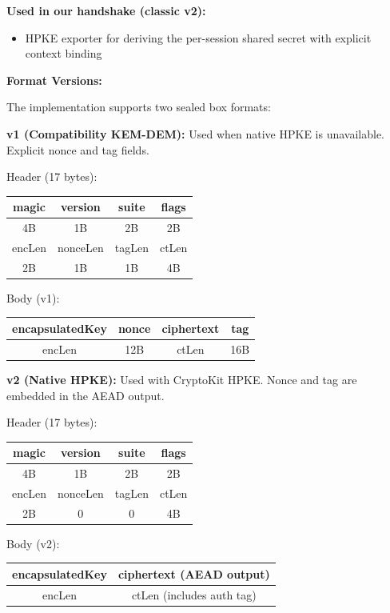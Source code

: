\documentclass[10pt,journal,compsoc]{IEEEtran}
\providecommand{\tightlist}{%
	  \setlength{\itemsep}{0pt}\setlength{\parskip}{0pt}}
\begin{document}
\textbf{Used in our handshake (classic v2):}
\begin{itemize}\tightlist
\item
  HPKE exporter for deriving the per-session shared secret with
  explicit context binding
\end{itemize}

\textbf{Format Versions:}

The implementation supports two sealed box formats:

\textbf{v1 (Compatibility KEM-DEM):} Used when native HPKE is
unavailable. Explicit nonce and tag fields.

Header (17 bytes):
\begin{center}
\small
\begin{tabular}{|c|c|c|c|}
\hline
magic & version & suite & flags \\
\hline
4B & 1B & 2B & 2B \\
\hline
encLen & nonceLen & tagLen & ctLen \\
\hline
2B & 1B & 1B & 4B \\
\hline
\end{tabular}
\end{center}

Body (v1):
\begin{center}
\small
\begin{tabular}{|c|c|c|c|}
\hline
encapsulatedKey & nonce & ciphertext & tag \\
\hline
encLen & 12B & ctLen & 16B \\
\hline
\end{tabular}
\end{center}

\textbf{v2 (Native HPKE):} Used with CryptoKit HPKE. Nonce and tag are
embedded in the AEAD output.

Header (17 bytes):
\begin{center}
\small
\begin{tabular}{|c|c|c|c|}
\hline
magic & version & suite & flags \\
\hline
4B & 1B & 2B & 2B \\
\hline
encLen & nonceLen & tagLen & ctLen \\
\hline
2B & 0 & 0 & 4B \\
\hline
\end{tabular}
\end{center}

Body (v2):
\begin{center}
\small
\begin{tabular}{|c|c|}
\hline
encapsulatedKey & ciphertext (AEAD output) \\
\hline
encLen & ctLen (includes auth tag) \\
\hline
\end{tabular}
\end{center}
\end{document}
